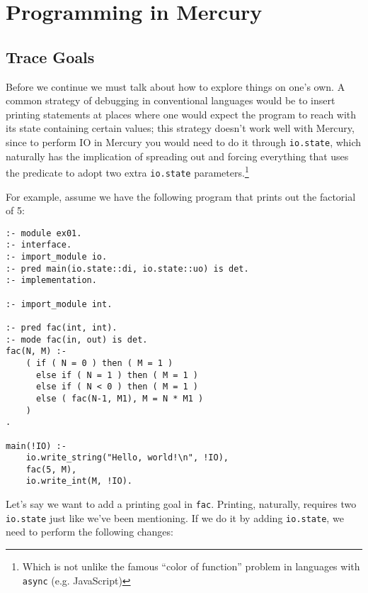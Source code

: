 \chapter{Programming in Mercury}

\section{Trace Goals}

Before we continue we must talk about how to explore things on one's own. A common strategy of debugging in conventional languages would be to insert printing statements at places where one would expect the program to reach with its state containing certain values; this strategy doesn't work well with Mercury, since to perform IO in Mercury you would need to do it through \texttt{io.state}, which naturally has the implication of spreading out and forcing everything that uses the predicate to adopt two extra \texttt{io.state} parameters.\footnote{Which is not unlike the famous ``color of function'' problem in languages with \texttt{async} (e.g. JavaScript)}

For example, assume we have the following program that prints out the factorial of 5:

\begin{lstlisting}[language=Mercury]
:- module ex01.
:- interface.
:- import_module io.
:- pred main(io.state::di, io.state::uo) is det.
:- implementation.

:- import_module int.

:- pred fac(int, int).
:- mode fac(in, out) is det.
fac(N, M) :-
	( if ( N = 0 ) then ( M = 1 )
	  else if ( N = 1 ) then ( M = 1 )
	  else if ( N < 0 ) then ( M = 1 )
	  else ( fac(N-1, M1), M = N * M1 )
	)
.

main(!IO) :-
    io.write_string("Hello, world!\n", !IO),
	fac(5, M),
	io.write_int(M, !IO).
\end{lstlisting}

Let's say we want to add a printing goal in \texttt{fac}. Printing, naturally, requires two \texttt{io.state} just like we've been mentioning. If we do it by adding \texttt{io.state}, we need to perform the following changes:

